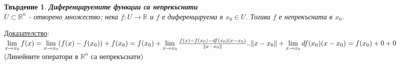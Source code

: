 \documentclass[12pt]{article}
\newtheorem{proposition}{Твърдение}
\begin{document}
	\begin{proposition} \textbf{Диференцируемите функции са непрекъснати}\\
		$U\subset\mathbb{R}^n$ - отворено множество; нека $f:U\rightarrow\mathbb{R}$ и $f$ е диференцируема в $x_0\in U$. Тогава $f$ е непрекъсната в $x_0$.
	\end{proposition}
	\underline{Доказателство}:\\
	\begin{math}
		\lim\limits_{x\to x_0}f(x) = \lim\limits_{x\to x_0}(f(x)-f(x_0)) + f(x_0) = f(x_0) + \lim\limits_{x\to x_0}\frac{f(x)-f(x_0)-df(x_0)(x-x_0)}{\|x-x_0\|}.\\
		.\|x-x_0\| + \lim\limits_{x\to x_0}df(x_0)(x-x_0) = f(x_0) + 0 + 0
	\end{math}\\
	(Линейните оператори в $\mathbb{R}^n$ са непрекъснати)
	
\end{document}
